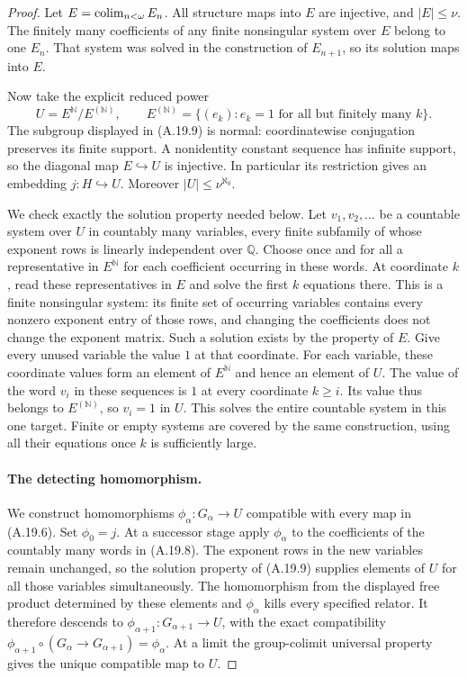 \begin{proof}
Let $E=\mathop{\rm colim}_{n<\omega}E_n$. All structure
maps into $E$ are injective, and $|E|\leq\nu$. The
finitely many coefficients of any finite nonsingular
system over $E$ belong to one $E_n$. That system was
solved in the construction of $E_{n+1}$, so its solution
maps into $E$.

Now take the explicit reduced power
\[
 U=E^{\mathbb N}/E^{(\mathbb N)},
 \qquad
 E^{(\mathbb N)}=
 \{(e_k):e_k=1\text{ for all but finitely many }k\}.
 \tag{A.19.9}
\]
The subgroup displayed in (A.19.9) is normal: coordinatewise
conjugation preserves its finite support. A nonidentity
constant sequence has infinite support, so the diagonal
map $E\hookrightarrow U$ is injective. In particular its
restriction gives an embedding $j:H\hookrightarrow U$.
Moreover $|U|\leq\nu^{\aleph_0}$.

We check exactly the solution property needed below.
Let $v_1,v_2,\ldots$ be a countable system over $U$ in
countably many variables, every finite subfamily of whose
exponent rows is linearly independent over $\mathbb Q$.
Choose once and for all a representative in $E^{\mathbb N}$
for each coefficient occurring in these words. At coordinate
$k$, read these representatives in $E$ and solve the first
$k$ equations there. This is a finite nonsingular system:
its finite set of occurring variables contains every
nonzero exponent entry of those rows, and changing the
coefficients does not change the exponent matrix. Such a
solution exists by the property of $E$. Give every unused
variable the value $1$ at that coordinate. For each
variable, these coordinate values form an element of
$E^{\mathbb N}$ and hence an element of $U$.
The value of the word $v_i$ in these sequences is $1$ at
every coordinate $k\geq i$. Its value thus belongs to
$E^{(\mathbb N)}$, so $v_i=1$ in $U$. This solves the
entire countable system in this one target. Finite or
empty systems are covered by the same construction,
using all their equations once $k$ is sufficiently large.

\paragraph{The detecting homomorphism.}
We construct homomorphisms $\phi_\alpha:G_\alpha\to U$
compatible with every map in (A.19.6). Set $\phi_0=j$.
At a successor stage apply $\phi_\alpha$ to the
coefficients of the countably many words in (A.19.8).
The exponent rows in the new variables remain unchanged,
so the solution property of (A.19.9) supplies elements
of $U$ for all those variables simultaneously. The
homomorphism from the displayed free product determined
by these elements and $\phi_\alpha$ kills every specified
relator. It therefore descends to
$\phi_{\alpha+1}:G_{\alpha+1}\to U$, with the exact
compatibility
$\phi_{\alpha+1}\circ(G_\alpha\to G_{\alpha+1})
=\phi_\alpha$. At a limit the group-colimit universal
property gives the unique compatible map to $U$.


\end{proof}
